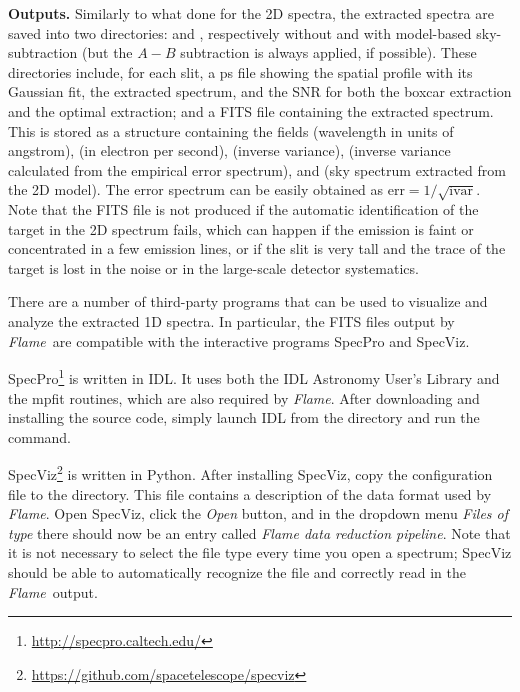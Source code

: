 \documentclass[a4paper]{article}
\newcommand{\flame}{\emph{Flame}}
\begin{document}
\begin{sloppypar}
\medskip
\noindent
\textbf{Outputs.} Similarly to what done for the 2D spectra, the extracted spectra are saved into two directories:  and , respectively without and with model-based sky-subtraction (but the $A-B$ subtraction is always applied, if possible). These directories include, for each slit, a ps file showing the spatial profile with its Gaussian fit, the extracted spectrum, and the SNR for both the boxcar extraction and the optimal extraction; and a FITS file containing the extracted spectrum. This is stored as a structure containing the fields  (wavelength in units of angstrom),  (in electron per second),  (inverse variance),  (inverse variance calculated from the empirical error spectrum), and  (sky spectrum extracted from the 2D model). The error spectrum can be easily obtained as $\mathrm{err} = 1/\sqrt{\mathrm{ivar}}$. Note that the FITS file is not produced if the automatic identification of the target in the 2D spectrum fails, which can happen if the emission is faint or concentrated in a few emission lines, or if the slit is very tall and the trace of the target is lost in the noise or in the large-scale detector systematics.

There are a number of third-party programs that can be used to visualize and analyze the extracted 1D spectra. In particular, the FITS files output by \flame\ are compatible with the interactive programs SpecPro and SpecViz.

SpecPro\footnote{\url{http://specpro.caltech.edu/}} is written in IDL. It uses both the IDL Astronomy User's Library and the mpfit routines, which are also required by \flame. After downloading and installing the source code, simply launch IDL from the  directory and run the  command.

SpecViz\footnote{\url{https://github.com/spacetelescope/specviz}} is written in Python. After installing SpecViz, copy the configuration file  to the  directory. This file contains a description of the data format used by \flame. Open SpecViz, click the \emph{Open} button, and in the dropdown menu \emph{Files of type} there should now be an entry called \emph{Flame data reduction pipeline}. Note that it is not necessary to select the file type every time you open a spectrum; SpecViz should be able to automatically recognize the file and correctly read in the \flame\ output.



\end{sloppypar}
\end{document}
